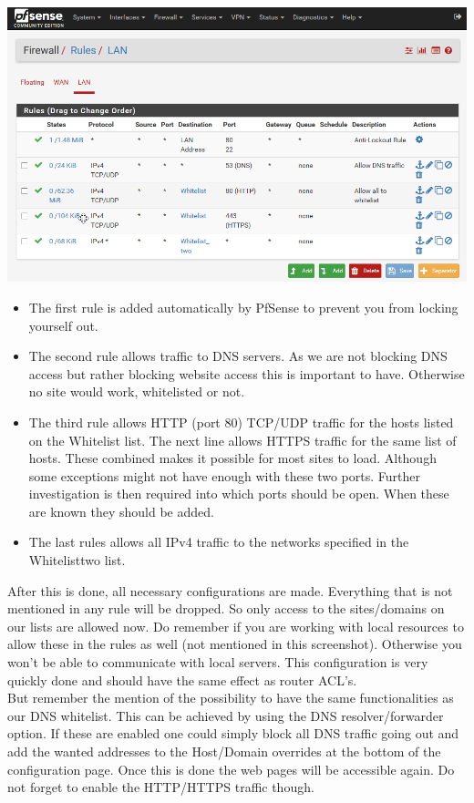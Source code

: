 \includegraphics[width=\textwidth]{img/Pfsense_Rules.png}
\begin{itemize}
\item The first rule is added automatically by PfSense to prevent you from locking yourself out.
\item The second rule allows traffic to DNS servers. As we are not blocking DNS access but rather blocking website access this is important to have. Otherwise no site would work, whitelisted or not.
\item The third rule allows HTTP (port 80) TCP/UDP traffic for the hosts listed on the Whitelist list.  The next line allows HTTPS traffic for the same list of hosts. These combined makes it possible for most sites to load. Although some exceptions might not have enough with these two ports. Further investigation is then required into which ports should be open. When these are known they should be added.
\item The last rules allows all IPv4 traffic to the networks specified in the Whitelist\textunderscore two list. 
\end{itemize}
After this is done, all necessary configurations are made. Everything that is not mentioned in any rule will be dropped. So only access to the sites/domains on our lists are allowed now. Do remember if you are working with local resources to allow these in the rules as well (not mentioned in this screenshot). Otherwise you won't be able to communicate with local servers. This configuration is very quickly done and should have the same effect as router ACL's. \\

But remember the mention of the possibility to have the same functionalities as our DNS whitelist. This can be achieved by using the DNS resolver/forwarder option. If these are enabled one could simply block all DNS traffic going out and add the wanted addresses to the Host/Domain overrides at the bottom of the configuration page. Once this is done the web pages will be accessible again. Do not forget to enable the HTTP/HTTPS traffic though.
